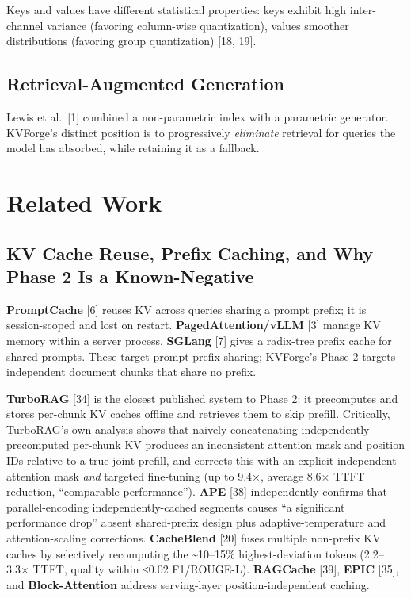 Keys and values have different statistical properties: keys exhibit high inter-channel variance (favoring column-wise quantization), values smoother distributions (favoring group quantization) {[}18, 19{]}.

\hypertarget{retrieval-augmented-generation}{%
\subsection{Retrieval-Augmented Generation}\label{retrieval-augmented-generation}}

Lewis et al.~{[}1{]} combined a non-parametric index with a parametric generator. KVForge's distinct position is to progressively \emph{eliminate} retrieval for queries the model has absorbed, while retaining it as a fallback.

\hypertarget{related-work}{%
\section{Related Work}\label{related-work}}

\hypertarget{kv-cache-reuse-prefix-caching-and-why-phase-2-is-a-known-negative}{%
\subsection{KV Cache Reuse, Prefix Caching, and Why Phase 2 Is a Known-Negative}\label{kv-cache-reuse-prefix-caching-and-why-phase-2-is-a-known-negative}}

\textbf{PromptCache} {[}6{]} reuses KV across queries sharing a prompt prefix; it is session-scoped and lost on restart. \textbf{PagedAttention/vLLM} {[}3{]} manage KV memory within a server process. \textbf{SGLang} {[}7{]} gives a radix-tree prefix cache for shared prompts. These target prompt-prefix sharing; KVForge's Phase 2 targets independent document chunks that share no prefix.

\textbf{TurboRAG} {[}34{]} is the closest published system to Phase 2: it precomputes and stores per-chunk KV caches offline and retrieves them to skip prefill. Critically, TurboRAG's own analysis shows that naively concatenating independently-precomputed per-chunk KV produces an inconsistent attention mask and position IDs relative to a true joint prefill, and corrects this with an explicit independent attention mask \emph{and} targeted fine-tuning (up to 9.4×, average 8.6× TTFT reduction, ``comparable performance''). \textbf{APE} {[}38{]} independently confirms that parallel-encoding independently-cached segments causes ``a significant performance drop'' absent shared-prefix design plus adaptive-temperature and attention-scaling corrections. \textbf{CacheBlend} {[}20{]} fuses multiple non-prefix KV caches by selectively recomputing the \textasciitilde10--15\% highest-deviation tokens (2.2--3.3× TTFT, quality within ≤0.02 F1/ROUGE-L). \textbf{RAGCache} {[}39{]}, \textbf{EPIC} {[}35{]}, and \textbf{Block-Attention} address serving-layer position-independent caching.

